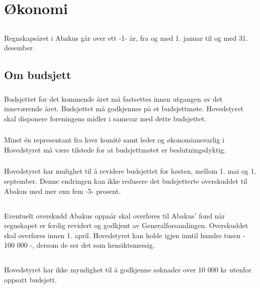 \section{Økonomi}

\subsection{}
Regnskapsåret i Abakus går over ett -1- år, fra og med 1. januar til og med 31. desember.

\subsection{Om budsjett}
\subsubsection{}
Budsjettet for det kommende året må fastsettes innen utgangen av det inneværende året. Budsjettet må godkjennes på et budsjettmøte. Hovedstyret skal disponere foreningens midler i samsvar med dette budsjettet.

\subsubsection{}
Minst én representant fra hver komité samt leder og økonomiansvarlig i Hovedstyret må være tilstede for at budsjettmøtet er beslutningsdyktig.

\subsubsection{}
Hovedstyret har mulighet til å revidere budsjettet for høsten, mellom 1. mai og 1. september.
Denne endringen kan ikke redusere det budsjetterte overskuddet til Abakus med mer enn fem -5- prosent.

\subsection{}
Eventuelt overskudd Abakus oppnår skal overføres til Abakus’ fond når regnskapet er ferdig revidert og godkjent av Generalforsamlingen. Overskuddet skal overføres innen 1. april. Hovedstyret kan holde igjen inntil hundre tusen - 100 000 -, dersom de ser det som hensiktsmessig.

\subsection{}
Hovedstyret har ikke myndighet til å godkjenne søknader over 10 000 kr utenfor
oppsatt budsjett.
